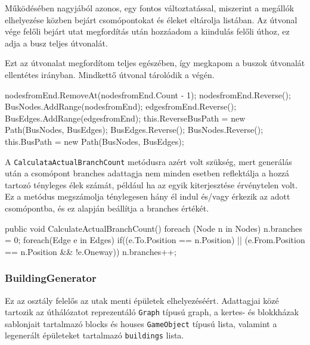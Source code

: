 Működésében nagyjából azonos, egy fontos változtatással, miszerint a megállók elhelyezése közben bejárt csomópontokat és éleket eltárolja listában. Az útvonal vége felőli bejárt utat megfordítás után hozzáadom a kiindulás felőli úthoz, ez adja a busz teljes útvonalát.

Ezt az útvonalat megfordítom teljes egészében, így megkapom a buszok útvonalát ellentétes irányban. Mindkettő útvonal tárolódik a végén.
\begin{cpp}
nodesfromEnd.RemoveAt(nodesfromEnd.Count - 1);
nodesfromEnd.Reverse();
BusNodes.AddRange(nodesfromEnd);
edgesfromEnd.Reverse();
BusEdges.AddRange(edgesfromEnd);
this.ReverseBusPath = new Path(BusNodes, BusEdges);
BusEdges.Reverse();
BusNodes.Reverse();
this.BusPath = new Path(BusNodes, BusEdges);
\end{cpp}
A \texttt{CalculataActualBranchCount} metódusra azért volt szükség, mert generálás után a csomópont branches adattagja nem minden esetben reflektálja a hozzá tartozó tényleges élek számát, például ha az egyik kiterjesztése érvénytelen volt. Ez a metódus megszámolja ténylegesen hány él indul és/vagy érkezik az adott csomópontba, és ez alapján beállítja a branches értékét.
\begin{cpp}
public void CalculateActualBranchCount()
        {
            foreach (Node n in Nodes)
            {
                n.branches = 0;
                foreach(Edge e in Edges)
                {
                    if((e.To.Position == n.Position) || 
                    (e.From.Position == n.Position && !e.Oneway))
                    {
                        n.branches++;
                    }
                }
            }
        }
\end{cpp}

\subsubsection{BuildingGenerator}

Ez az osztály felelős az utak menti épületek elhelyezéséért. Adattagjai közé tartozik az úthálózatot reprezentáló \texttt{Graph} típusú graph, a kertes- és blokkházak sablonjait tartalmazó blocks és houses \texttt{GameObject} típusú lista, valamint a legenerált épületeket tartalmazó \texttt{buildings} lista.

